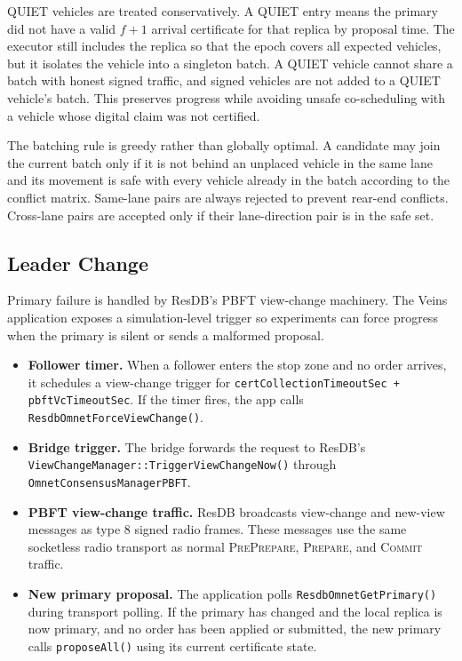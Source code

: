 \documentclass[fleqn,10pt]{olplainarticle}
\begin{document}
QUIET vehicles are treated conservatively. A QUIET entry means the primary did not have a valid $f+1$ arrival certificate for that replica by proposal time. The executor still includes the replica so that the epoch covers all expected vehicles, but it isolates the vehicle into a singleton batch. A QUIET vehicle cannot share a batch with honest signed traffic, and signed vehicles are not added to a QUIET vehicle's batch. This preserves progress while avoiding unsafe co-scheduling with a vehicle whose digital claim was not certified.

The batching rule is greedy rather than globally optimal. A candidate may join the current batch only if it is not behind an unplaced vehicle in the same lane and its movement is safe with every vehicle already in the batch according to the conflict matrix. Same-lane pairs are always rejected to prevent rear-end conflicts. Cross-lane pairs are accepted only if their lane-direction pair is in the safe set.

\subsection{Leader Change}
\label{subsec:leader-change}

Primary failure is handled by ResDB's PBFT view-change machinery. The Veins application exposes a simulation-level trigger so experiments can force progress when the primary is silent or sends a malformed proposal.

\begin{itemize}
    \item \textbf{Follower timer.} When a follower enters the stop zone and no order arrives, it schedules a view-change trigger for \texttt{certCollectionTimeoutSec + pbftVcTimeoutSec}. If the timer fires, the app calls \texttt{ResdbOmnetForceViewChange()}.
    \item \textbf{Bridge trigger.} The bridge forwards the request to ResDB's \texttt{ViewChangeManager::TriggerViewChangeNow()} through \texttt{OmnetConsensusManagerPBFT}.
    \item \textbf{PBFT view-change traffic.} ResDB broadcasts view-change and new-view messages as type 8 signed radio frames. These messages use the same socketless radio transport as normal \textsc{PrePrepare}, \textsc{Prepare}, and \textsc{Commit} traffic.
    \item \textbf{New primary proposal.} The application polls \texttt{ResdbOmnetGetPrimary()} during transport polling. If the primary has changed and the local replica is now primary, and no order has been applied or submitted, the new primary calls \texttt{proposeAll()} using its current certificate state.
\end{itemize}
\end{document}
